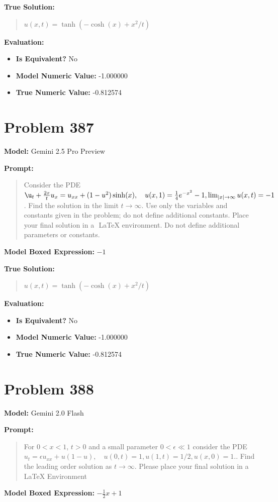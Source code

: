 \documentclass{article}
\begin{document}
{\textbf{True Solution:}
\begin{quote}
$u(x,t) = \tanh(-\cosh(x) + x^2/t)$
\end{quote}

\textbf{Evaluation:}
\begin{itemize}
\item \textbf{Is Equivalent?} No
\item \textbf{Model Numeric Value:} -1.000000
\item \textbf{True Numeric Value:} -0.812574
\end{itemize}
\vspace{1cm}
\section*{Problem 387}
\textbf{Model:} Gemini 2.5 Pro Preview

\textbf{Prompt:}
\begin{quote}
Consider the PDE $\u_t + \frac{2x}{t} u_x = u_{xx} + (1-u^2) \sinh(x), \quad u(x,1) = \frac{1}{4}e^{-x^2} -1, \lim_{|x| \to \infty} u(x, t) = -1$. Find the solution in the limit $t \to \infty$. Use only the variables and constants given in the problem; do not define additional constants. Place your final solution in a $\boxed{}$ LaTeX environment. Do not define additional parameters or constants.
\end{quote}
\textbf{Model Boxed Expression:} $-1$

\textbf{True Solution:}
\begin{quote}
$u(x,t) = \tanh(-\cosh(x) + x^2/t)$
\end{quote}

\textbf{Evaluation:}
\begin{itemize}
\item \textbf{Is Equivalent?} No
\item \textbf{Model Numeric Value:} -1.000000
\item \textbf{True Numeric Value:} -0.812574
\end{itemize}
\vspace{1cm}
\section*{Problem 388}
\textbf{Model:} Gemini 2.0 Flash

\textbf{Prompt:}
\begin{quote}
For $0 < x < 1$, $t > 0$ and a small parameter $0 < \epsilon \ll 1$ consider the PDE $u_t = \epsilon u_{xx} + u(1-u), \quad u(0, t) = 1, u(1, t) = 1/2, u(x, 0) =1.$. Find the leading order solution as $t \to \infty$. Please place your final solution in a $\boxed{}$ LaTeX Environment
\end{quote}
\textbf{Model Boxed Expression:} $-\frac{1}{2}x + 1$

}
\end{document}
